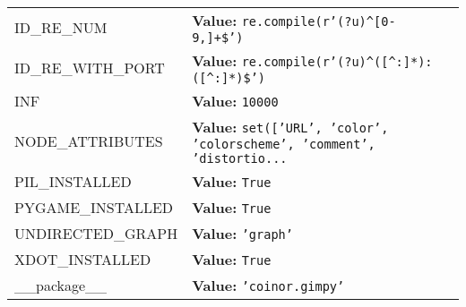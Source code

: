 \begin{longtable}{|p{\varnamewidth}|p{\vardescrwidth}|l}
\raggedright I\-D\-\_\-R\-E\-\_\-N\-U\-M\- & \raggedright \textbf{Value:} 
{\tt re.compile(r'\texttt{(?u)}{\textasciicircum}\texttt{[}0\texttt{-}9,\texttt{]}\texttt{+}\$')}&\\
\cline{1-2}
\raggedright I\-D\-\_\-R\-E\-\_\-W\-I\-T\-H\-\_\-P\-O\-R\-T\- & \raggedright \textbf{Value:} 
{\tt re.compile(r'\texttt{(?u)}{\textasciicircum}\texttt{(}\texttt{[{\textasciicircum}}:\texttt{]}\texttt{*}\texttt{)}:\texttt{(}\texttt{[{\textasciicircum}}:\texttt{]}\texttt{*}\texttt{)}\$')}&\\
\cline{1-2}
\raggedright I\-N\-F\- & \raggedright \textbf{Value:} 
{\tt 10000}&\\
\cline{1-2}
\raggedright N\-O\-D\-E\-\_\-A\-T\-T\-R\-I\-B\-U\-T\-E\-S\- & \raggedright \textbf{Value:} 
{\tt \texttt{set([}\texttt{'}\texttt{URL}\texttt{'}\texttt{, }\texttt{'}\texttt{color}\texttt{'}\texttt{, }\texttt{'}\texttt{colorscheme}\texttt{'}\texttt{, }\texttt{'}\texttt{comment}\texttt{'}\texttt{, }\texttt{'}\texttt{distortio}\texttt{...}}&\\
\cline{1-2}
\raggedright P\-I\-L\-\_\-I\-N\-S\-T\-A\-L\-L\-E\-D\- & \raggedright \textbf{Value:} 
{\tt True}&\\
\cline{1-2}
\raggedright P\-Y\-G\-A\-M\-E\-\_\-I\-N\-S\-T\-A\-L\-L\-E\-D\- & \raggedright \textbf{Value:} 
{\tt True}&\\
\cline{1-2}
\raggedright U\-N\-D\-I\-R\-E\-C\-T\-E\-D\-\_\-G\-R\-A\-P\-H\- & \raggedright \textbf{Value:} 
{\tt \texttt{'}\texttt{graph}\texttt{'}}&\\
\cline{1-2}
\raggedright X\-D\-O\-T\-\_\-I\-N\-S\-T\-A\-L\-L\-E\-D\- & \raggedright \textbf{Value:} 
{\tt True}&\\
\cline{1-2}
\raggedright \_\-\_\-p\-a\-c\-k\-a\-g\-e\-\_\-\_\- & \raggedright \textbf{Value:} 
{\tt \texttt{'}\texttt{coinor.gimpy}\texttt{'}}&\\
\cline{1-2}
\end{longtable}


